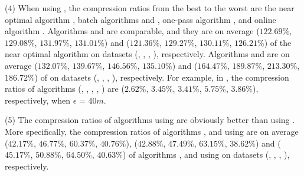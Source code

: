 \sstab (4) When using \sed, the compression ratios from the best
to the worst are the near optimal algorithm \nopts, batch algorithms \tpa and
\dpa, one-pass algorithm \cised, and online algorithm \squishe. Algorithms \tpa
and \dpa are comparable, and they are on average
($122.69\%$, $129.08\%$, $131.97\%$, $131.01\%$) and ($121.36\%$, $129.27\%$, $130.11\%$, $126.21\%$)
 of the near optimal algorithm \nopts on datasets (\ucar, \geolife, \mopsi,
 \act), respectively.
 Algorithms \cised and \squishe are on average ($132.07\%$, $139.67\%$,
 $146.56\%$, $135.10\%$) and ($164.47\%$, $189.87\%$, $213.30\%$, $186.72\%$)
 of \nopts on datasets (\ucar, \geolife, \mopsi, \act), respectively.
For example, in \mopsi, the compression ratios of algorithms
(\nopts, \tpa, \dpa, \squishe, \cised)
are ($2.62\%$, $3.45\%$, $3.41\%$, $5.75\%$, $3.86\%$), respectively, when $\epsilon$ = $40m$. 

\sstab (5) The compression ratios of algorithms using \ped are obviously better
than using \sed.
More specifically, the compression ratios of algorithms \optp, \tpa and \dpa
using \ped are on average ($42.17\%$, $46.77\%$, $60.37\%$, $40.76\%$),
($42.88\%$, $47.49\%$, $63.15\%$, $38.62\%$) and ($45.17\%$, $50.88\%$,
$64.50\%$, $40.63\%$) of algorithms \nopts, \tpa and \dpa using \sed on datasets (\ucar, \geolife, \mopsi, \act), respectively.
	





